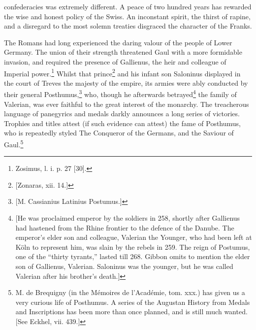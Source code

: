 confederacies was extremely different. A peace of two hundred years has rewarded the wise and honest policy of the Swiss. An inconstant spirit, the thirst of rapine, and a disregard to the most solemn treaties disgraced the character of the Franks.

The Romans had long experienced the daring valour of the people of Lower Germany. The union of their strength threatened Gaul with a more formidable invasion, and required the presence of Gallienus, the heir and colleague of Imperial power.\footnote{Zosimus, l. i. p. 27 [30].} Whilst that prince\footnote{[Zonaras, xii. 14.]} and his infant son Saloninus displayed in the court of Treves the majesty of the empire, its armies were ably conducted by their general Posthumus,\footnote{[M. Cassianius Latinius Postumus.]} who, though he afterwards betrayed\footnote{[He was proclaimed emperor by the soldiers in 258, shortly after Gallienus had hastened from the Rhine frontier to the defence of the Danube. The emperor\texthebrew{}’s elder son and colleague, Valerian the Younger, who had been left at Köln to represent him, was slain by the rebels in 259. The reign of Postumus, one of the \texthebrew{“}thirty tyrants,\texthebrew{}” lasted till 268. Gibbon omits to mention the elder son of Gallienus, Valerian. Saloninus was the younger, but he was called Valerian after his brother\texthebrew{}’s death.]} the family of Valerian, was ever faithful to the great interest of the monarchy. The treacherous language of panegyrics and medals darkly announces a long series of victories. Trophies and titles attest (if such evidence can attest) the fame of Posthumus, who is repeatedly styled The Conqueror of the Germans, and the Saviour of Gaul.\footnote{M. de Brequigny (in the Mémoires de l\texthebrew{}’Académie, tom. xxx.) has given us a very curious life of Posthumus. A series of the Augustan History from Medals and Inscriptions has been more than once planned, and is still much wanted. [See Eckhel, vii. 439.]}

